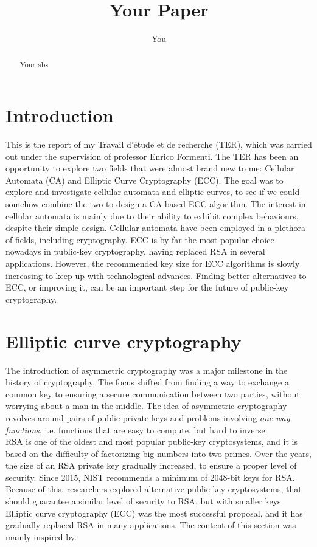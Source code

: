 \documentclass{article}
\title{Your Paper}
\author{You}
\begin{document}
\maketitle

\begin{abstract}
Your abs
\end{abstract}

\newpage
    
\section{Introduction}
This is the report of my Travail d'étude et de recherche (TER), which was carried out under the supervision of professor Enrico Formenti. The TER has been an opportunity to explore two fields that were almost brand new to me: Cellular Automata (CA) and Elliptic Curve Cryptography (ECC). The goal was to explore and investigate cellular automata and elliptic curves, to see if we could somehow combine the two to design a CA-based ECC algorithm. The interest in cellular automata is mainly due to their ability to exhibit complex behaviours, despite their simple design. Cellular automata have been employed in a plethora of fields, including cryptography. ECC is by far the most popular choice nowadays in public-key cryptography, having replaced RSA in several applications. However, the recommended key size for ECC algorithms is slowly increasing to keep up with technological advances. Finding better alternatives to ECC, or improving it, can be an important step for the future of public-key cryptography. \\

\section{Elliptic curve cryptography}
\label{sec:ecc}
    The introduction of asymmetric cryptography was a major milestone in the history of cryptography. The focus shifted from finding a way to exchange a common key to ensuring a secure communication between two parties, without worrying about a man in the middle. The idea of asymmetric cryptography revolves around pairs of public-private keys and problems involving \emph{one-way functions}, i.e. functions that are easy to compute, but hard to inverse.\\
    
    RSA is one of the oldest and most popular public-key cryptosystems, and it is based on the difficulty of factorizing big numbers into two primes. Over the years, the size of an RSA private key gradually increased, to ensure a proper level of security. Since 2015, NIST recommends a minimum of 2048-bit keys for RSA. Because of this, researchers explored alternative public-key cryptosystems, that should guarantee a similar level of security to RSA, but with smaller keys. Elliptic curve cryptography (ECC) was the most successful proposal, and it has gradually replaced RSA in many applications. The content of this section was mainly inspired by.
\end{document}
